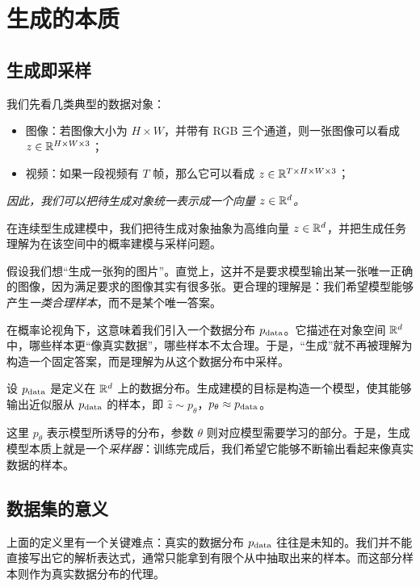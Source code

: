 ﻿\section{生成的本质}

\subsection{生成即采样}

我们先看几类典型的数据对象：
\begin{itemize}
  \item 图像：若图像大小为 $H\times W$，并带有 RGB 三个通道，则一张图像可以看成 $z \in \mathbb{R}^{H\times W\times 3}$；
  \item 视频：如果一段视频有 $T$ 帧，那么它可以看成 $z \in \mathbb{R}^{T\times H\times W\times 3}$；
\end{itemize}

\emph{因此，我们可以把待生成对象统一表示成一个向量 $z \in \mathbb{R}^d$。}


\begin{definition}[对象的向量表示]
在连续型生成建模中，我们把待生成对象抽象为高维向量 $z \in \mathbb{R}^d$，并把生成任务理解为在该空间中的概率建模与采样问题。
\end{definition}

假设我们想“生成一张狗的图片”。直觉上，这并不是要求模型输出某一张唯一正确的图像，因为满足要求的图像其实有很多张。更合理的理解是：我们希望模型能够产生\emph{一类合理样本}，而不是某个唯一答案。

在概率论视角下，这意味着我们引入一个数据分布 $p_{\mathrm{data}}$。它描述在对象空间 $\mathbb{R}^d$ 中，哪些样本更“像真实数据”，哪些样本不太合理。于是，“生成”就不再被理解为构造一个固定答案，而是理解为从这个数据分布中采样。

\begin{definition}[生成建模问题]
设 $p_{\mathrm{data}}$ 是定义在 $\mathbb{R}^d$ 上的数据分布。生成建模的目标是构造一个模型，使其能够输出近似服从 $p_{\mathrm{data}}$ 的样本，即 $\hat{z} \sim p_{\theta}$，$ p_{\theta} \approx p_{\mathrm{data}}$。
\end{definition}

这里 $p_{\theta}$ 表示模型所诱导的分布，参数 $\theta$ 则对应模型需要学习的部分。于是，生成模型本质上就是一个\emph{采样器}：训练完成后，我们希望它能够不断输出看起来像真实数据的样本。

\subsection{数据集的意义}

上面的定义里有一个关键难点：真实的数据分布 $p_{\mathrm{data}}$ 往往是未知的。我们并不能直接写出它的解析表达式，通常只能拿到有限个从中抽取出来的样本。而这部分样本则作为真实数据分布的代理。

